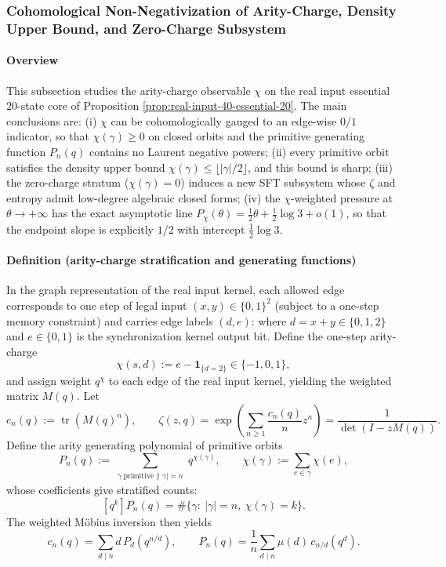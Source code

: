 \subsubsection{Cohomological Non-Negativization of Arity-Charge, Density Upper Bound, and Zero-Charge Subsystem}\label{app:real-input-40-arity-charge}
\paragraph{Overview}
This subsection studies the arity-charge observable $\chi$ on the real input essential $20$-state core of Proposition \ref{prop:real-input-40-essential-20}.
The main conclusions are: (\textup{i}) $\chi$ can be cohomologically gauged to an edge-wise $0/1$ indicator, so that $\chi(\gamma)\ge 0$ on closed orbits and the primitive generating function $P_n(q)$ contains no Laurent negative powers;
(\textup{ii}) every primitive orbit satisfies the density upper bound $\chi(\gamma)\le \lfloor|\gamma|/2\rfloor$, and this bound is sharp;
(\textup{iii}) the zero-charge stratum ($\chi(\gamma)=0$) induces a new SFT subsystem whose $\zeta$ and entropy admit low-degree algebraic closed forms;
(\textup{iv}) the $\chi$-weighted pressure at $\theta\to+\infty$ has the exact asymptotic line $P_\chi(\theta)=\frac12\theta+\frac12\log 3+o(1)$, so that the endpoint slope is explicitly $1/2$ with intercept $\frac12\log 3$.

\paragraph{Definition (arity-charge stratification and generating functions)}
In the graph representation of the real input kernel, each allowed edge corresponds to one step of legal input $(x,y)\in\{0,1\}^2$ (subject to a one-step memory constraint) and carries edge labels $(d,e)$:
where $d=x+y\in\{0,1,2\}$ and $e\in\{0,1\}$ is the synchronization kernel output bit.
Define the one-step arity-charge
\[
\chi(s,d):=e-\mathbf{1}_{\{d=2\}}\in\{-1,0,1\},
\]
and assign weight $q^{\chi}$ to each edge of the real input kernel, yielding the weighted matrix $M(q)$.
Let
\[
c_n(q):=\operatorname{tr}(M(q)^n),
\qquad
\zeta(z,q)=\exp\!\left(\sum_{n\ge 1}\frac{c_n(q)}{n}z^n\right)
=\frac{1}{\det(I-zM(q))}.
\]
Define the arity generating polynomial of primitive orbits
\[
P_n(q):=\sum_{\substack{\gamma\ \mathrm{primitive}\|\gamma|=n}} q^{\chi(\gamma)},
\qquad
\chi(\gamma):=\sum_{e\in\gamma}\chi(e),
\]
whose coefficients give stratified counts:
\[
[q^k]P_n(q)=\#\{\gamma:\ |\gamma|=n,\ \chi(\gamma)=k\}.
\]
The weighted M\"obius inversion then yields
\[
c_n(q)=\sum_{d\mid n} d\,P_d\!\left(q^{n/d}\right),
\qquad
P_n(q)=\frac{1}{n}\sum_{d\mid n}\mu(d)\,c_{n/d}\!\left(q^{d}\right).
\]

